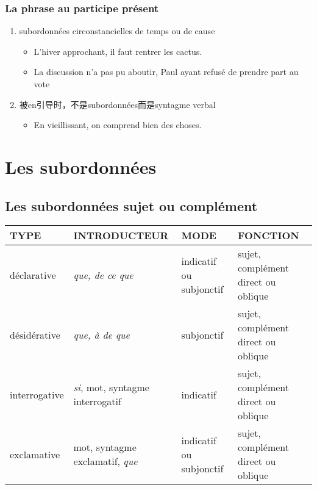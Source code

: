 \documentclass[UTF8]{report}
\begin{document}
\subsubsection{La phrase au participe présent}
\begin{enumerate}
    \item subordonnées circonstancielles de temps ou de cause
    \begin{itemize}
        \item L’hiver approchant, il faut rentrer les cactus.
        \item La discussion n’a pas pu aboutir, Paul ayant refusé de prendre part au vote
    \end{itemize}
    \item 被en引导时，不是subordonnées而是syntagme verbal
    \begin{itemize}
        \item En vieillissant, on comprend bien des choses.
    \end{itemize}
\end{enumerate}

\section{Les subordonnées}
\subsection{Les subordonnées sujet ou complément}

\begin{table}[H]
    \centering
    \small
    \begin{tabular}{|p{2.5cm}|p{3.5cm}|>{\RaggedRight}p{2.5cm}|p{4.5cm}|}
    \hline
    \rowcolor{cyan!20}
    \textbf{TYPE} & \textbf{INTRODUCTEUR} & \textbf{MODE} & \textbf{FONCTION} \\
    \hline
    déclarative & \textit{que, de ce que} & indicatif ou subjonctif & sujet, complément direct ou oblique \\
    \hline
    désidérative & \textit{que, à de que} & subjonctif & sujet, complément direct ou oblique \\
    \hline
    interrogative & \textit{si}, mot, syntagme interrogatif & indicatif &  sujet, complément direct ou oblique \\
    \hline
    exclamative & mot, syntagme exclamatif, \textit{que} & indicatif ou subjonctif &  sujet, complément direct ou oblique \\
    \hline
    \end{tabular}
\end{table}
\end{document}

